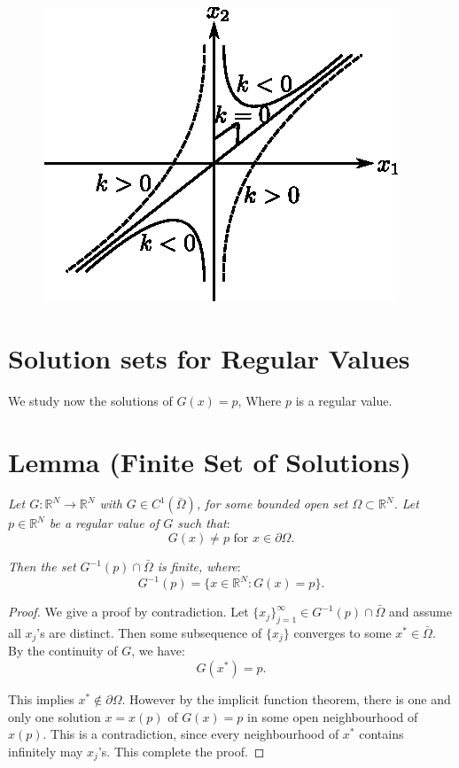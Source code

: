 \begin{figure}[H]
\centering
\includegraphics{vol79-fig/fig79-19.eps}
\smallskip
\caption{}\label{chap3-fig3.1}
\end{figure}


\section{Solution sets for Regular
  Values}\pageoriginale\label{chap3-sec3.4}%
 
We study now the solutions of $G(x) = p$, Where $p$ is a regular
value. 
 
\section{Lemma (Finite Set of Solutions)}\label{chap3-sec3.5}%

\textit{Let $G : \mathbb{R}^N \rightarrow \mathbb{R}^N$ with
$G \in C^1 (\bar\Omega)$, for some bounded open set $\Omega
\subset \mathbb{R}^N$. Let $p \in \mathbb{R}^N$ be a regular
  value of $G$ such that}: 
$$
G(x) \neq p  \text{ \ for \ } x \in \partial\Omega.
$$

\textit{Then the set $G^{-1}(p) \cap \bar{\Omega}$ is finite, where}:
$$
G^{-1}(p)  = \{ x \in \mathbb{R}^N : G(x) = p \}.
$$

\begin{proof}
We give a proof by contradiction. Let $\{ x_j \}^\infty_{j = 1} \in
G^{-1} (p) \cap \bar{\Omega}$ and assume all $x_j$'s are
distinct. Then some subsequence of $\{ x_j \}$ converges to some $x^*
\in \bar{\Omega}$. By the continuity of $G$, we have: 
$$
G(x^*) = p.
$$

This implies $x^* \notin \partial \Omega$. However by the implicit
function theorem, there is one and only one solution $x = x(p)$ of
$G(x) = p$ in some open neighbourhood of $x(p)$. This is a
contradiction, since every neighbourhood of $x^*$ contains infinitely
may $x_j$'s. This complete the proof. 
\end{proof}

